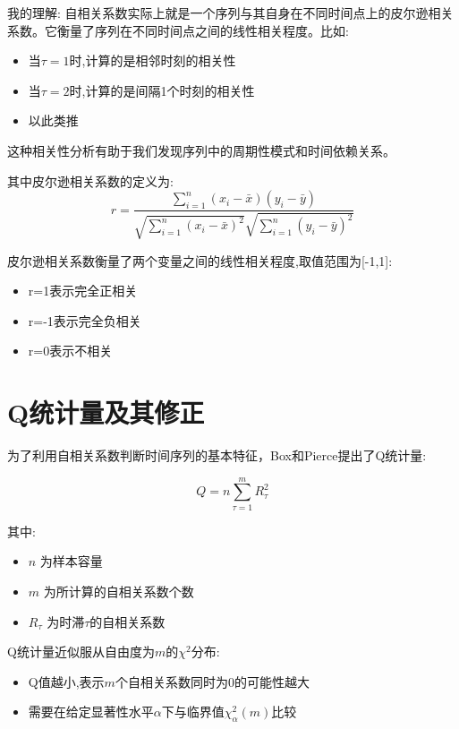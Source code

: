 \begin{remark}
我的理解:
自相关系数实际上就是一个序列与其自身在不同时间点上的皮尔逊相关系数。它衡量了序列在不同时间点之间的线性相关程度。比如:
\begin{itemize}
    \item 当$\tau=1$时,计算的是相邻时刻的相关性
    \item 当$\tau=2$时,计算的是间隔1个时刻的相关性
    \item 以此类推
\end{itemize}
这种相关性分析有助于我们发现序列中的周期性模式和时间依赖关系。

其中皮尔逊相关系数的定义为:
\begin{equation}
r = \frac{\sum_{i=1}^n(x_i-\bar{x})(y_i-\bar{y})}{\sqrt{\sum_{i=1}^n(x_i-\bar{x})^2}\sqrt{\sum_{i=1}^n(y_i-\bar{y})^2}}
\end{equation}

皮尔逊相关系数衡量了两个变量之间的线性相关程度,取值范围为[-1,1]:
\begin{itemize}
    \item r=1表示完全正相关
    \item r=-1表示完全负相关
    \item r=0表示不相关
\end{itemize}
\end{remark}


\section{Q统计量及其修正}

为了利用自相关系数判断时间序列的基本特征，Box和Pierce提出了Q统计量:

\begin{equation}
Q = n\sum_{\tau=1}^m R_\tau^2
\end{equation}

其中:
\begin{itemize}
    \item $n$ 为样本容量
    \item $m$ 为所计算的自相关系数个数
    \item $R_\tau$ 为时滞$\tau$的自相关系数
\end{itemize}

Q统计量近似服从自由度为$m$的$\chi^2$分布:
\begin{itemize}
    \item Q值越小,表示$m$个自相关系数同时为0的可能性越大
    \item 需要在给定显著性水平$\alpha$下与临界值$\chi_\alpha^2(m)$比较
\end{itemize}

